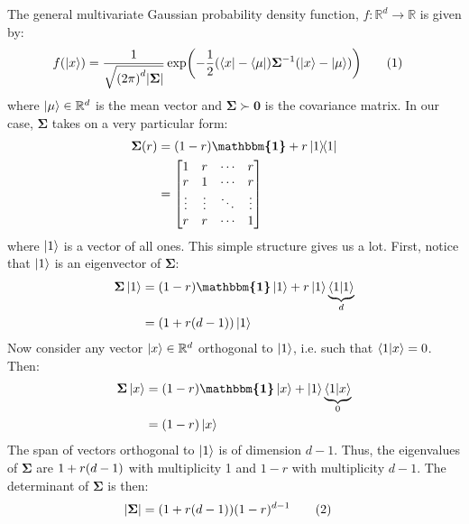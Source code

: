\documentclass[12pt]{article}
\numberwithin{theorem}{section}
\numberwithin{equation}{section}
\numberwithin{figure}{section}
\begin{document}
The general multivariate Gaussian probability density function, \(f : \mathbb{R}^{d} \to \mathbb{R}\) is given by:
\begin{align*}
    f\qty(\ket{x}) &= \frac{1}{\sqrt{\qty(2\pi)^{d}\abs{\bm{\Sigma}}}} \exp(-\frac{1}{2}\qty(\bra{x} - \bra{\mu})\bm{\Sigma}^{-1}\qty(\ket{x} - \ket{\mu}))\stepcounter{equation}\tag{\theequation}\label{eq:pdf}
\end{align*}
where \(\ket{\mu}\in \mathbb{R}^{d}\) is the mean vector and \(\bm{\Sigma}\succ \bm{0}\) is the covariance matrix. In our case, \(\bm{\Sigma}\) takes on a very particular form:
\begin{align*}
    \bm{\Sigma}\qty(r) &= \qty(1 - r)\bm{\mathbbm{1}} + r \op{1} \\
                       &= \begin{bmatrix}
                            1 & r & \cdots & r \\
                            r & 1 & \cdots & r \\
                            \vdots & \vdots & \ddots & \vdots \\
                            r & r & \cdots & 1
                        \end{bmatrix}
\end{align*}
where \(\ket{1}\) is a vector of all ones. This simple structure gives us a lot. First, notice that \(\ket{1}\) is an eigenvector of \(\bm{\Sigma}\):
\begin{align*}
    \bm{\Sigma}\ket{1} &= \qty(1 - r)\bm{\mathbbm{1}}\ket{1} + r\ket{1}\underbrace{\bra{1}\ket{1}}_{d} \\
                       &= (1 + r\qty(d-1))\ket{1}
\end{align*}
Now consider any vector \(\ket{x}\in \mathbb{R}^{d}\) orthogonal to \(\ket{1}\),
i.e. such that \(\bra{1}\ket{x} = 0\). Then:
\begin{align*}
    \bm{\Sigma}\ket{x} &= \qty(1 - r)\bm{\mathbbm{1}}\ket{x} + \ket{1}\underbrace{\bra{1}\ket{x}}_{0} \\
                       &= (1 - r)\ket{x}
\end{align*}
The span of vectors orthogonal to \(\ket{1}\) is of dimension \(d - 1\). Thus, the eigenvalues of \(\bm{\Sigma}\) are \(1+r\qty(d-1)\) with multiplicity 1 and \(1 - r\) with multiplicity \(d - 1\). The determinant of \(\bm{\Sigma}\) is then:
\begin{align*}
    \abs{\bm{\Sigma}} &= (1 + r\qty(d-1))(1 - r)^{d - 1} \stepcounter{equation}\tag{\theequation}\label{eq:det}
\end{align*}
\end{document}
